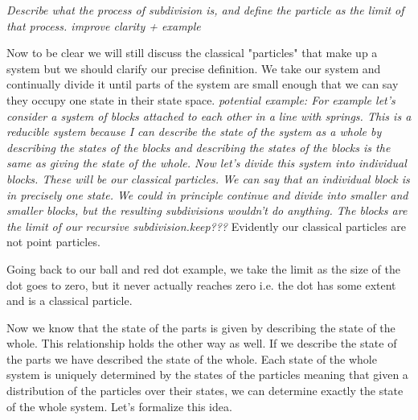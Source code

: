\documentclass{article}
\begin{document}
	 
	 \emph{Describe what the process of subdivision is, and define the particle as the limit of that process. improve clarity + example}
	
	 Now to be clear we will still discuss the classical "particles" that make up a system but we should clarify our precise definition. We take our system and continually divide it until parts of the system are small enough that we can say they occupy one state in their state space. 
	 \emph{potential example: For example let's consider a system of blocks attached to each other in a line with springs. This is a reducible system because I can describe the state of the system as a whole by describing the states of the blocks and describing the states of the blocks is the same as giving the state of the whole. Now let's divide this system into individual blocks. These will be our classical particles. We can say that an individual block is in precisely one state. We could in principle continue and divide into smaller and smaller blocks, but the resulting subdivisions wouldn't do anything. The blocks are the limit of our recursive subdivision.keep???} Evidently our classical particles are not point particles.
	 
	 Going back to our ball and red dot example, we take the limit as the size of the dot goes to zero, but it never actually reaches zero i.e. the dot has some extent and is a classical particle.
	
	Now we know that the state of the parts is given by describing the state of the whole. This relationship holds the other way as well. If we describe the state of the parts we have described the state of the whole. Each state of the whole system is uniquely determined by the states of the particles meaning that given a distribution of the particles over their states, we can determine exactly the state of the whole system. Let's formalize this idea.
	
\end{document}
